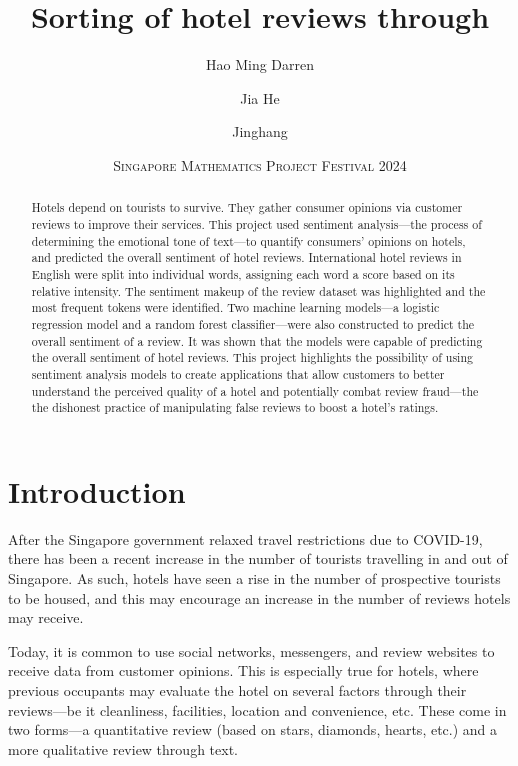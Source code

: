 \documentclass[12pt, a4paper, oneside]{pancake-article}
\title{Sorting \tint{sentiments} of hotel reviews through
\tint{machine learning}}
\author{\tint{Yap} Hao Ming Darren \and \tint{Tan} Jia He \and
\tint{Fu} Jinghang}
\date{\scshape Singapore Mathematics Project Festival 2024}
\begin{document}
\maketitle
\thispagestyle{empty}
\pagebreak
\tableofcontents
\thispagestyle{empty}

\pagebreak
\thispagestyle{empty}

\begin{abstract}
  Hotels depend on tourists to survive. They gather consumer opinions
  via customer
  reviews to improve their services. This project used sentiment analysis---the
  process of determining the emotional tone of text---to quantify consumers'
  opinions on hotels, and predicted the overall sentiment of hotel reviews.
  International hotel reviews in English were split into individual words,
  assigning each word a score based on its relative intensity. The sentiment
  makeup of the review dataset was highlighted and the most frequent tokens were
  identified. Two machine learning models---a logistic regression
  model and a random
  forest classifier---were also constructed to predict the overall
  sentiment of a
  review. It was shown that the models were capable of predicting the overall
  sentiment of hotel reviews. This project highlights the possibility of using
  sentiment analysis models to create applications that allow
  customers to better
  understand the perceived quality of a hotel and potentially combat
  review fraud---the
  the dishonest practice of manipulating false reviews to boost a
  hotel's ratings.
\end{abstract}

\pagebreak

\pagestyle{fancy}
\setcounter{page}{1}

\section{Introduction}
After the Singapore government relaxed travel restrictions due to COVID-19,
there has been a recent increase in the number of tourists travelling
in and out of Singapore.
As such, hotels have seen a rise in the number of prospective
tourists to be housed,
and this may encourage an increase in the number of reviews hotels may receive.

Today, it is common to use social networks, messengers, and review websites
to receive data from customer opinions. This is especially true for hotels,
where previous occupants may evaluate the hotel on several factors through their
reviews---be it cleanliness, facilities, location and convenience, etc.
These come in two forms---a quantitative review (based on stars, diamonds,
hearts, etc.) and a more qualitative review through text.
\end{document}

